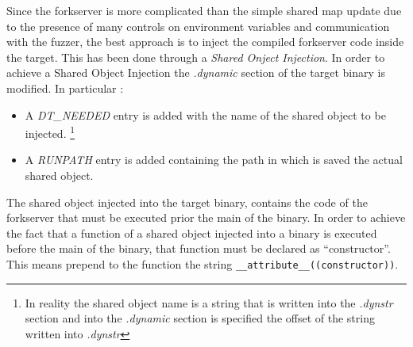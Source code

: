     Since the forkserver is more complicated than the simple shared map update due to the presence of many controls on 
    environment variables and communication with the fuzzer, 
    the best approach is to inject the compiled forkserver code inside the target.
    This has been done through a \textit{Shared Onject Injection}.
    In order to achieve a Shared Object Injection the \textit{.dynamic} section of the target binary is modified.
    In particular :
    \begin{itemize}
        \item A \textit{DT\_NEEDED} entry is added with the name of the shared object to be injected. \footnote{ In reality 
            the shared object name is a string that is written into the \textit{.dynstr} section and into the 
            \textit{.dynamic} section is specified the offset of the string written into \textit{.dynstr}}
        \item A \textit{RUNPATH} entry is added containing the path in which is saved the actual shared object.
    \end{itemize}

    The shared object injected into the target binary, contains the code of the forkserver that must be executed 
    prior the main of the binary.
    In order to achieve the fact that a function of a shared object injected into a binary is executed before the main 
    of the binary, that function must be declared as ``constructor''.
    This means prepend to the function the string \texttt{\_\_attribute\_\_((constructor))}.

